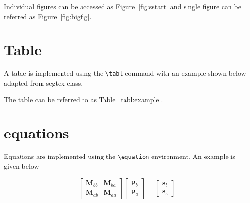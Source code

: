 \documentclass{edger}
\begin{document}
Individual figures can be accessed as Figure~\ref{fig:sstart} and single figure can be referred as Figure~\ref{fig:bigfig}.

\lipsum[1-7]  
\section*{Table}
A table is implemented using the \verb|\tabl| command with an example shown below adapted from segtex class.

The table can be referred to as Table~\ref{tabl:example}.

\lipsum[1-7]  
\section*{equations}

Equations are implemented using the \verb|\equation| environment. An example is given below

\begin{equation}
\begin{bmatrix}
\mathbf{M}_{bb} & \mathbf{M}_{ba} \\
\mathbf{M}_{ab} & \mathbf{M}_{aa}
\end{bmatrix}
\begin{bmatrix}
\mathbf{p}_{b}  \\
\mathbf{p}_{a} 
\end{bmatrix}
=
\begin{bmatrix}
\mathbf{s}_{b}  \\
\mathbf{s}_{a} 
\end{bmatrix}
\label{eqn:system}
\end{equation}
\end{document}
